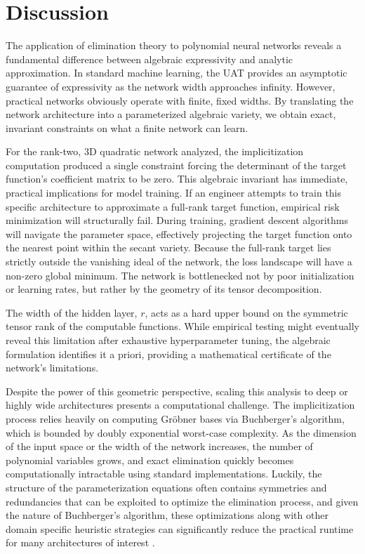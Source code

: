 \section{Discussion}

The application of elimination theory to polynomial neural networks reveals a fundamental difference between algebraic expressivity and analytic approximation. In standard machine learning, the UAT provides an asymptotic guarantee of expressivity as the network width approaches infinity. However, practical networks obviously operate with finite, fixed widths. By translating the network architecture into a parameterized algebraic variety, we obtain exact, invariant constraints on what a finite network can learn.

For the rank-two, 3D quadratic network analyzed, the implicitization computation produced a single constraint forcing the determinant of the target function's coefficient matrix to be zero. This algebraic invariant has immediate, practical implications for model training. If an engineer attempts to train this specific architecture to approximate a full-rank target function, empirical risk minimization will structurally fail. During training, gradient descent algorithms will navigate the parameter space, effectively projecting the target function onto the nearest point within the secant variety. Because the full-rank target lies strictly outside the vanishing ideal of the network, the loss landscape will have a non-zero global minimum. The network is bottlenecked not by poor initialization or learning rates, but rather by the geometry of its tensor decomposition. 

The width of the hidden layer, $r$, acts as a hard upper bound on the symmetric tensor rank of the computable functions. While empirical testing might eventually reveal this limitation after exhaustive hyperparameter tuning, the algebraic formulation identifies it a priori, providing a mathematical certificate of the network's limitations.

Despite the power of this geometric perspective, scaling this analysis to deep or highly wide architectures presents a computational challenge. The implicitization process relies heavily on computing Gröbner bases via Buchberger's algorithm, which is bounded by doubly exponential worst-case complexity. As the dimension of the input space or the width of the network increases, the number of polynomial variables grows, and exact elimination quickly becomes computationally intractable using standard implementations. Luckily, the structure of the parameterization equations often contains symmetries and redundancies that can be exploited to optimize the elimination process, and given the nature of Buchberger's algorithm, these optimizations along with other domain specific heuristic strategies can significantly reduce the practical runtime for many architectures of interest \cite{cox2015IVA}.

